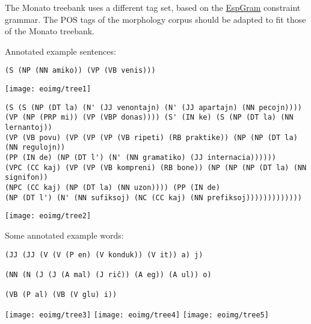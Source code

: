 \documentclass[10pt,a4paper]{article}
\begin{document}
The Monato treebank uses a different tag set, based on the 
\href{http://beta.visl.sdu.dk/visl/eo/index.php}{EspGram} constraint 
grammar. The POS tags of the morphology corpus should be adapted 
to fit those of the Monato treebank.

Annotated example sentences:

\begin{verbatim}
(S (NP (NN amiko)) (VP (VB venis)))
\end{verbatim}

\texttt{[image: eoimg/tree1]}


\begin{verbatim}
(S (S (NP (DT la) (N' (JJ venontajn) (N' (JJ apartajn) (NN pecojn)))) 
(VP (NP (PRP mi)) (VP (VBP donas)))) (S' (IN ke) (S (NP (DT la) (NN lernantoj)) 
(VP (VB povu) (VP (VP (VP (VB ripeti) (RB praktike)) (NP (NP (DT la) (NN regulojn)) 
(PP (IN de) (NP (DT l') (N' (NN gramatiko) (JJ internacia)))))) 
(VPC (CC kaj) (VP (VP (VB kompreni) (RB bone)) (NP (NP (NP (DT la) (NN signifon)) 
(NPC (CC kaj) (NP (DT la) (NN uzon)))) (PP (IN de) 
(NP (DT l') (N' (NN sufiksoj) (NC (CC kaj) (NN prefiksoj)))))))))))))
\end{verbatim}

\texttt{[image: eoimg/tree2]}

Some annotated example words:

\begin{verbatim}
(JJ (JJ (V (V (P en) (V konduk)) (V it)) a) j)

(NN (N (J (J (A mal) (J riĉ)) (A eg)) (A ul)) o)

(VB (P al) (VB (V glu) i))
\end{verbatim}

\texttt{[image: eoimg/tree3]}
\texttt{[image: eoimg/tree4]}
\texttt{[image: eoimg/tree5]}
\end{document}
